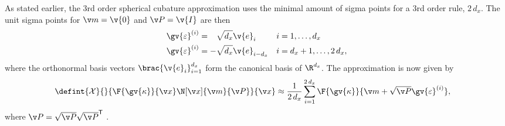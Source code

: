 As stated earlier, the 3rd order spherical cubature approximation uses the minimal amount
of sigma points for a 3rd order rule, $2\,d_x$. The unit sigma points for $\m=\v{0}$ and $\P=\v{I}$ are then
\begin{align}
	\gv{\varepsilon}^{(i)}& = \hphantom{-}\sqrt{d_x}\v{e}_i &  i&=1,\dots,d_x\\
	\gv{\varepsilon}^{(i)}& = -\sqrt{d_x}\v{e}_{i-d_x} & i&=d_x+1,\dots,2\,d_x,
	\label{eq:ckf_sigma}
\end{align}
where the orthonormal basis vectors $\brac{\v{e}_i}_{i=1}^{d_x}$ form the canonical basis of $\R^{d_x}$. 
The approximation is now given by
\begin{align}
	\defint{\mathcal{X}}{}{\F{\gv{\kappa}}{\x}\N[\x]{\m}{\P}}{\x} &\approx 
	\frac{1}{2\,d_x} \sum_{i=1}^{2\,d_x} \F{\gv{\kappa}}{\m+\sqrt{\P}\gv{\varepsilon}^{(i)}},
	\label{eq:ckf_approx}
\end{align}%
where $\P=\sqrt{\P}\sqrt{\P}^\tr$ \parencite{Sarkka2012a,Arasaratnam2009,Wu2006}.









